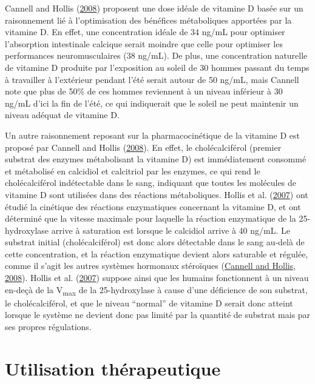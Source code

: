 \documentclass[
  a4paper,
  DIV=11,
  numbers=noendperiod,
  listof=totoc]{scrreprt}
\begin{document}
Cannell and Hollis (\protect\hyperlink{ref-Cannell.2008}{2008})
proposent une dose idéale de vitamine D basée sur un raisonnement lié à
l'optimisation des bénéfices métaboliques apportées par la vitamine D.
En effet, une concentration idéale de 34 ng/mL pour optimiser
l'absorption intestinale calcique serait moindre que celle pour
optimiser les performances neuromusculaires (38 ng/mL). De plus, une
concentration naturelle de vitamine D produite par l'exposition au
soleil de 30 hommes passant du temps à travailler à l'extérieur pendant
l'été serait autour de 50 ng/mL, mais Cannell note que plus de 50\% de
ces hommes reviennent à un niveau inférieur à 30 ng/mL d'ici la fin de
l'été, ce qui indiquerait que le soleil ne peut maintenir un niveau
adéquat de vitamine D.

Un autre raisonnement reposant sur la pharmacocinétique de la vitamine D
est proposé par Cannell and Hollis
(\protect\hyperlink{ref-Cannell.2008}{2008}). En effet, le
cholécalciférol (premier substrat des enzymes métabolisant la vitamine
D) est immédiatement consommé et métabolisé en calcidiol et calcitriol
par les enzymes, ce qui rend le cholécalciférol indétectable dans le
sang, indiquant que toutes les molécules de vitamine D sont utilisées
dans des réactions métaboliques. Hollis et al.
(\protect\hyperlink{ref-Hollis.2007}{2007}) ont étudié la cinétique des
réactions enzymatiques concernant la vitamine D, et ont déterminé que la
vitesse maximale pour laquelle la réaction enzymatique de la
25-hydroxylase arrive à saturation est lorsque le calcidiol arrive à 40
ng/mL. Le substrat initial (cholécalciférol) est donc alors détectable
dans le sang au-delà de cette concentration, et la réaction enzymatique
devient alors saturable et régulée, comme il s'agit les autres systèmes
hormonaux stéroïques (\protect\hyperlink{ref-Cannell.2008}{Cannell and
Hollis, 2008}). Hollis et al.
(\protect\hyperlink{ref-Hollis.2007}{2007}) suppose ainsi que les
humains fonctionnent à un niveau en-deçà de la V\textsubscript{max} de
la 25-hydroxylase à cause d'une déficience de son substrat, le
cholécalciférol, et que le niveau ``normal'' de vitamine D serait donc
atteint lorsque le système ne devient donc pas limité par la quantité de
substrat mais par ses propres régulations.

\hypertarget{utilisation-thuxe9rapeutique}{%
\section{Utilisation thérapeutique}\label{utilisation-thuxe9rapeutique}}
\end{document}
